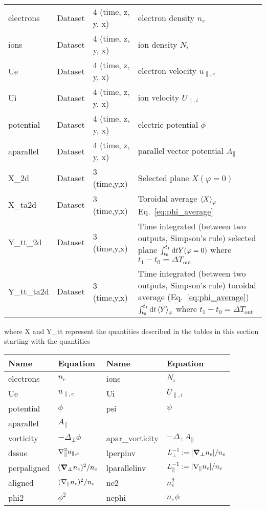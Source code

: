 \begin{longtable}{lll>{\RaggedRight}p{7cm}}
electrons        & Dataset & 4 (time, z, y, x) & electron density $n_e$ \\
ions             & Dataset & 4 (time, z, y, x) & ion density $N_i$ \\
Ue               & Dataset & 4 (time, z, y, x) & electron velocity $u_{\parallel,e}$ \\
Ui               & Dataset & 4 (time, z, y, x) & ion velocity $U_{\parallel,i}$ \\
potential        & Dataset & 4 (time, z, y, x) & electric potential $\phi$ \\
aparallel        & Dataset & 4 (time, z, y, x) & parallel vector potential $A_\parallel$ \\
X\_2d            & Dataset & 3 (time,y,x) & Selected plane $X(\varphi=0)$ \\
X\_ta2d          & Dataset & 3 (time,y,x) & Toroidal average $\left \langle  X  \right\rangle_\varphi$
Eq.~\eqref{eq:phi_average} \\
Y\_tt\_2d        & Dataset & 3 (time,y,x) & Time integrated (between two outputs, Simpson's rule) selected plane
$\int_{t_0}^{t_1}\mathrm{d} t Y(\varphi=0) $
where $t_1 - t_0 = \Delta T_{\text{out}}$ \\
Y\_tt\_ta2d      & Dataset & 3 (time,y,x) & Time integrated (between two outputs, Simpson's rule) toroidal average (Eq.~\eqref{eq:phi_average})
$\int_{t_0}^{t_1}\mathrm{d} t \left \langle  Y  \right\rangle_\varphi$
where $t_1 - t_0 = \Delta T_{\text{out}}$ \\
\bottomrule
\end{longtable}
where
X and Y\_tt represent the quantities described in the tables in this section starting with the quantities
\begin{longtable}{llll}
\toprule
\rowcolor{gray!50}\textbf{Name} &  \textbf{Equation} & \textbf{Name} &  \textbf{Equation}\\
\midrule
    electrons &$n_e$ &
    ions &$N_i$ \\
    Ue &$u_{\parallel,e}$ &
    Ui &$U_{\parallel,i}$ \\
    potential &$\phi$ &
    psi &$\psi$ \\
    aparallel &$A_\parallel$ & \\
    vorticity &$-\Delta_\perp\phi$ &
    apar\_vorticity &$-\Delta_\perp A_\parallel$ \\
    dssue & $\nabla_\parallel^2 u_{\parallel,e}$&
    lperpinv &$L_\perp^{-1} := |{\boldsymbol{{\boldsymbol{\nabla}}_{\perp}}} n_e|/n_e$ \\
    perpaligned &$({\boldsymbol{{\boldsymbol{\nabla}}_{\perp}}} n_e)^2/n_e$ &
    lparallelinv &$L_\parallel^{-1} := |\nabla_\parallel n_e|/n_e$ \\
    aligned &$ (\nabla_\parallel n_e)^2/n_e$ &
    ne2 & $n_e^2$ \\
    phi2 & $\phi^2$ &
    nephi & $n_e\phi$ \\
\bottomrule
\end{longtable}
